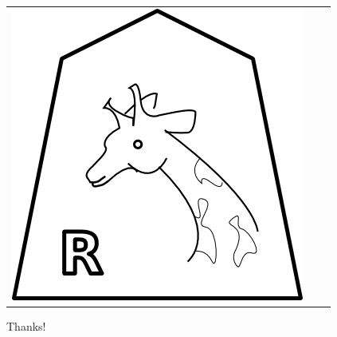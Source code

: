 \documentclass{beamer}
\begin{document}
\begin{frame}
\begin{center}
\begin{tabular}{ccc}
\includegraphics[scale = 0.2]{../../graphics/Rook.png}\\
\end{tabular}
\vspace{0.5in}

Thanks!
\end{center}
\end{frame}
\end{document}
